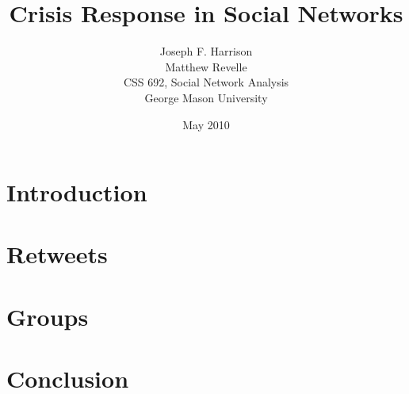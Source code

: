 \documentclass[a4paper, 11pt, titlepage]{article}
\begin{document}
\title{Crisis Response in Social Networks}
\author{Joseph F. Harrison \\
        Matthew Revelle \\
        CSS 692, Social Network Analysis \\
        George Mason University}
\date{May 2010}
\maketitle

\tableofcontents
\newpage

\section{Introduction}

\section{Retweets}

\section{Groups}

\section{Conclusion}



\end{document}
